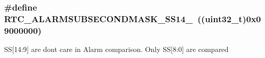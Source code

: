 \subsubsection[{\texorpdfstring{R\+T\+C\+\_\+\+A\+L\+A\+R\+M\+S\+U\+B\+S\+E\+C\+O\+N\+D\+M\+A\+S\+K\+\_\+\+S\+S14\+\_\+9}{RTC_ALARMSUBSECONDMASK_SS14_9}}]{\setlength{\rightskip}{0pt plus 5cm}\#define R\+T\+C\+\_\+\+A\+L\+A\+R\+M\+S\+U\+B\+S\+E\+C\+O\+N\+D\+M\+A\+S\+K\+\_\+\+S\+S14\+\_~((uint32\+\_\+t)0x09000000)}\hypertarget{group___r_t_c___alarm___sub___seconds___masks___definitions_ga173d153f6543cd34062d8ca14fb04975}{}\label{group___r_t_c___alarm___sub___seconds___masks___definitions_ga173d153f6543cd34062d8ca14fb04975}
SS\mbox{[}14\+:9\mbox{]} are don\textquotesingle{}t care in Alarm comparison. Only SS\mbox{[}8\+:0\mbox{]} are compared 